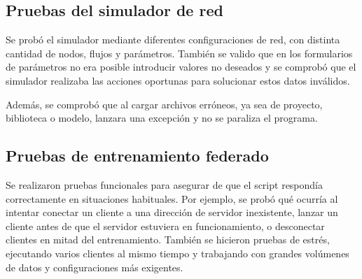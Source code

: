 \subsection{Pruebas del simulador de red}
\label{subsec:PruebasSimulador}
Se probó el simulador mediante diferentes configuraciones de red, con distinta cantidad de nodos, flujos y parámetros. También se valido que en los formularios de parámetros no era posible introducir valores no deseados y se comprobó que el simulador realizaba las acciones oportunas para solucionar estos datos inválidos.

Además, se comprobó que al cargar archivos erróneos, ya sea de proyecto, biblioteca o modelo, lanzara una excepción y no se paraliza el programa.

\subsection{Pruebas de entrenamiento federado}
\label{subsec:PruebasEntrenamientoFederado}
Se realizaron pruebas funcionales para asegurar de que el script respondía correctamente en situaciones habituales. Por ejemplo, se probó qué ocurría al intentar conectar un cliente a una dirección de servidor inexistente, lanzar un cliente antes de que el servidor estuviera en funcionamiento, o desconectar clientes en mitad del entrenamiento. También se hicieron pruebas de estrés, ejecutando varios clientes al mismo tiempo y trabajando con grandes volúmenes de datos y configuraciones más exigentes.
